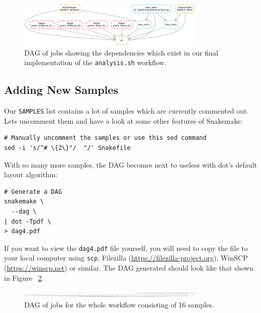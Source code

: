 \begin{figure}[H]
\centering
\includegraphics[width=0.8\textwidth]{handout/dag3.pdf}
\caption{DAG of jobs showing the dependencies which exist in our final implementation of the \texttt{analysis.sh} workflow.}
\label{fig:dag3}
\end{figure}

\subsection{Adding New Samples}

Our \texttt{SAMPLES} list contains a lot of samples which are currently commented out.
Lets uncomment them and have a look at some other features of Snakemake:

\begin{lstlisting}
# Manually uncomment the samples or use this sed command
sed -i 's/^# \{2\}"/  "/' Snakefile
\end{lstlisting}

With so many more samples, the DAG becomes next to useless with dot's default layout algorithm:

\begin{lstlisting}
# Generate a DAG
snakemake \
  --dag \
| dot -Tpdf \
> dag4.pdf
\end{lstlisting}

\begin{warning}

If you want to view the \texttt{dag4.pdf} file yourself, you will need to copy the file to your local computer using \texttt{scp}, Filezilla (\url{https://filezilla-project.org}), WinSCP (\url{https://winscp.net}) or similar.
The DAG generated should look like that shown in Figure ~\ref{fig:dag4}.

\end{warning}

\begin{figure}[H]
\centering
\includegraphics[width=0.8\textwidth]{handout/dag4.pdf}
\caption{DAG of jobs for the whole workflow consisting of 16 samples.}
\label{fig:dag4}
\end{figure}

